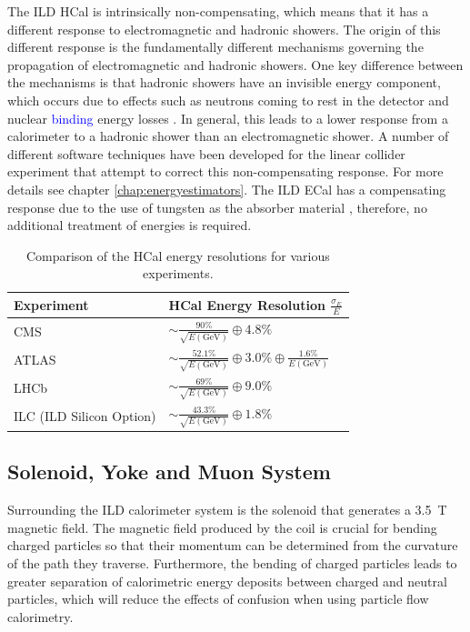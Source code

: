 The ILD HCal is intrinsically non-compensating, which means that it has a different response to electromagnetic and hadronic showers.  The origin of this different response is the fundamentally different mechanisms governing the propagation of electromagnetic and hadronic showers.  One key difference between the mechanisms is that hadronic showers have an invisible energy component, which occurs due to  effects such as neutrons coming to rest in the detector and nuclear \textcolor{blue}{binding} energy losses \cite{Tran:2017tgr}.  In general, this leads to a lower response from a calorimeter to a hadronic shower than an electromagnetic shower.  A number of different software techniques have been developed for the linear collider experiment that attempt to correct this non-compensating response.  For more details see chapter \ref{chap:energyestimators}.  The ILD ECal has a compensating response due to the use of tungsten as the absorber material \cite{Blaising:2015nla}, therefore, no additional treatment of energies is required.

\begin{table}[h!]
\centering
\begin{tabular}{ l l }
\hline
Experiment & HCal Energy Resolution $\frac{\sigma_{E}}{E}$ \\
\hline
CMS \cite{Budd:2001eu} & $\sim \frac{90\%}{\sqrt{E(\text{GeV})}} \oplus 4.8\%$ \\
ATLAS \cite{Airapetian:1996iv} & $\sim \frac{52.1\%}{\sqrt{E(\text{GeV})}} \oplus 3.0\% \oplus \frac{1.6\%}{E(\text{GeV})}$ \\
LHCb \cite{Perret:2014owa} & $\sim \frac{69\%}{\sqrt{E(\text{GeV})}} \oplus 9.0\%$ \\
ILC (ILD Silicon Option) \cite{Behnke:2013lya} & $\sim \frac{43.3\%}{\sqrt{E(\text{GeV})}} \oplus 1.8\%$ \\
\hline
\end{tabular}
\caption[Comparison of the HCal energy resolutions for various experiments.]{Comparison of the HCal energy resolutions for various experiments.}
\label{table:hcalenergyres}
\end{table}


\subsection{Solenoid, Yoke and Muon System}
Surrounding the ILD calorimeter system is the solenoid that generates a 3.5~T magnetic field.  The magnetic field produced by the coil is crucial for bending charged particles so that their momentum can be determined from the curvature of the path they traverse.  Furthermore, the bending of charged particles leads to greater separation of calorimetric energy deposits between charged and neutral particles, which will reduce the effects of confusion when using particle flow calorimetry.  

